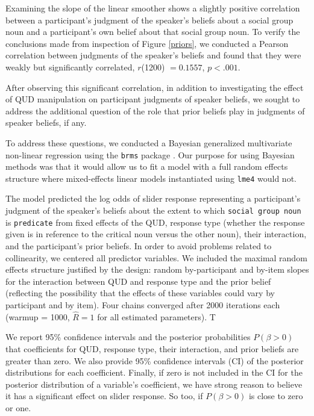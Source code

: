 \documentclass[11pt,a4paper]{article}
\begin{document}
Examining the slope of the linear smoother shows a slightly positive correlation between a participant's judgment of the speaker's beliefs about a social group noun and a participant's own belief about that social group noun. To verify the conclusions made from inspection of Figure \ref{priors}, we conducted a Pearson correlation between judgments of the speaker's beliefs and found that they were weakly but significantly correlated, $r$(1200) $= 0.1557$, $p < .001$.

After observing this significant correlation, in addition to investigating the effect of QUD manipulation on participant judgments of speaker beliefs, we sought to address the additional question of the role that prior beliefs play in judgments of speaker beliefs, if any.  

To address these questions, we conducted a Bayesian generalized multivariate non-linear regression using the \texttt{brms} package \cite{buerkner}. Our purpose for using Bayesian methods was that it would allow us to fit a model with a full random effects structure where mixed-effects linear models instantiated using \texttt{lme4} would not. 

The model predicted the log odds of slider response representing a participant's judgment of the speaker's beliefs about the extent to which \texttt{social group noun} is \texttt{predicate} from fixed effects of the QUD, response type (whether the response given is in reference to the critical noun versus the other noun), their interaction, and the participant's prior beliefs. In order to avoid problems related to collinearity, we centered all predictor variables. We included the maximal random effects structure justified by the design: random by-participant and by-item slopes for the interaction between QUD and response type and the prior belief (reflecting the possibility that the effects of these variables could vary by participant and by item). Four chains converged after 2000 iterations each (warmup = 1000, \(\hat{R}=1\) for all estimated parameters). T 

We report 95\% confidence intervals and the posterior probabilities $P(\beta > 0)$ that coefficients for QUD, response type, their interaction, and prior beliefs are greater than zero. We also provide 95\% confidence intervals (CI) of the posterior distributions for each coefficient.  Finally, if zero is not included in the CI for the posterior distribution of a variable's coefficient, we have strong reason to believe it has a significant effect on slider response. So too, if $P(\beta > 0)$ is close to zero or one.
\end{document}
